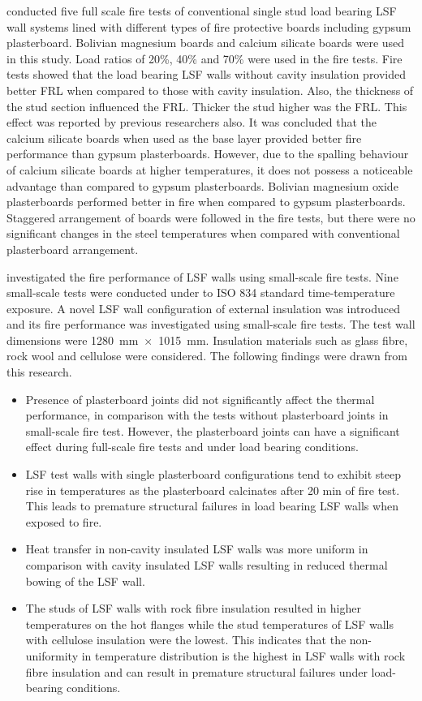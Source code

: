 \citet{Chen2012a} conducted five full scale fire tests of conventional single stud load bearing LSF wall systems lined with different types of fire protective boards including gypsum plasterboard. Bolivian magnesium boards and calcium silicate boards were used in this study. Load ratios of 20\%, 40\% and 70\% were used in the fire tests. Fire tests showed that the load bearing LSF walls without cavity insulation provided better FRL when compared to those with cavity insulation. Also, the thickness of the stud section influenced the FRL. Thicker the stud higher was the FRL. This effect was reported by previous researchers also. It was concluded that the calcium silicate boards when used as the base layer provided better fire performance than gypsum plasterboards. However, due to the spalling behaviour of calcium silicate boards at higher temperatures, it does not possess a noticeable advantage than compared to gypsum plasterboards. Bolivian magnesium oxide plasterboards performed better in fire when compared to gypsum plasterboards. Staggered arrangement of boards were followed in the fire tests, but there were no significant changes in the steel temperatures when compared with conventional plasterboard arrangement. 

\citet{Kolarkar2012} investigated the fire performance of LSF walls using small-scale fire tests. Nine small-scale tests were conducted under to ISO 834 standard time-temperature exposure. A novel LSF wall configuration of external insulation was introduced and its fire performance was investigated using small-scale fire tests. The test wall dimensions were 1280~mm~$\times$~1015~mm. Insulation materials such as glass fibre, rock wool and cellulose were considered. The following findings were drawn from this research.
\begin{itemize}
	\item Presence of plasterboard joints did not significantly affect the thermal performance, in comparison with the tests without plasterboard joints in small-scale fire test. However, the plasterboard joints can have a significant effect during full-scale fire tests and under load bearing conditions.
	\item LSF test walls with single plasterboard configurations tend to exhibit steep rise in temperatures as the plasterboard calcinates after 20 min of fire test. This leads to premature structural failures in load bearing LSF walls when exposed to fire.
	\item Heat transfer in non-cavity insulated LSF walls was more uniform in comparison with cavity insulated LSF walls resulting in reduced thermal bowing of the LSF wall.
	\item The studs of LSF walls with rock fibre insulation resulted in higher temperatures on the hot flanges while the stud temperatures of LSF walls with cellulose insulation were the lowest. This indicates that the non-uniformity in temperature distribution is the highest in LSF walls with rock fibre insulation and can result in premature structural failures under load-bearing conditions.
\end{itemize}

